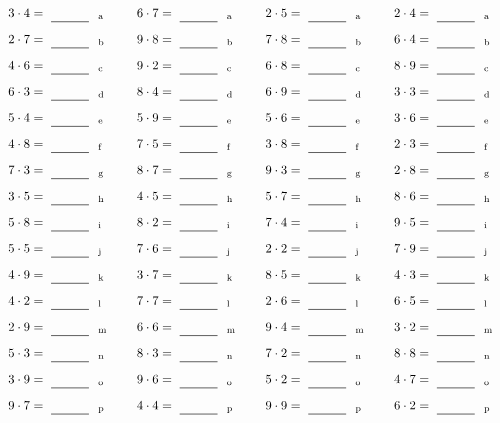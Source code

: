 \documentclass
[
  draft    = true,
  fontsize = 11pt,
  parskip  = half-
]
{scrartcl}
\begin{document}
\par\vfill\par
\begin{align*}
    \pline{3\cdot4}&=\rline{a}
  & \pline{6\cdot7}&=\rline{a}
  & \pline{2\cdot5}&=\rline{a}
  & \pline{2\cdot4}&=\rline{a} \\[1ex]
    \pline{2\cdot7}&=\rline{b}
  & \pline{9\cdot8}&=\rline{b}
  & \pline{7\cdot8}&=\rline{b}
  & \pline{6\cdot4}&=\rline{b} \\[1ex]
    \pline{4\cdot6}&=\rline{c}
  & \pline{9\cdot2}&=\rline{c}
  & \pline{6\cdot8}&=\rline{c}
  & \pline{8\cdot9}&=\rline{c} \\[1ex]
    \pline{6\cdot3}&=\rline{d}
  & \pline{8\cdot4}&=\rline{d}
  & \pline{6\cdot9}&=\rline{d}
  & \pline{3\cdot3}&=\rline{d} \\[1ex]
    \pline{5\cdot4}&=\rline{e}
  & \pline{5\cdot9}&=\rline{e}
  & \pline{5\cdot6}&=\rline{e}
  & \pline{3\cdot6}&=\rline{e} \\[1ex]
    \pline{4\cdot8}&=\rline{f}
  & \pline{7\cdot5}&=\rline{f}
  & \pline{3\cdot8}&=\rline{f}
  & \pline{2\cdot3}&=\rline{f} \\[1ex]
    \pline{7\cdot3}&=\rline{g}
  & \pline{8\cdot7}&=\rline{g}
  & \pline{9\cdot3}&=\rline{g}
  & \pline{2\cdot8}&=\rline{g} \\[1ex]
    \pline{3\cdot5}&=\rline{h}
  & \pline{4\cdot5}&=\rline{h}
  & \pline{5\cdot7}&=\rline{h}
  & \pline{8\cdot6}&=\rline{h} \\[1ex]
    \pline{5\cdot8}&=\rline{i}
  & \pline{8\cdot2}&=\rline{i}
  & \pline{7\cdot4}&=\rline{i}
  & \pline{9\cdot5}&=\rline{i} \\[1ex]
    \pline{5\cdot5}&=\rline{j}
  & \pline{7\cdot6}&=\rline{j}
  & \pline{2\cdot2}&=\rline{j}
  & \pline{7\cdot9}&=\rline{j} \\[1ex]
    \pline{4\cdot9}&=\rline{k}
  & \pline{3\cdot7}&=\rline{k}
  & \pline{8\cdot5}&=\rline{k}
  & \pline{4\cdot3}&=\rline{k} \\[1ex]
    \pline{4\cdot2}&=\rline{l}
  & \pline{7\cdot7}&=\rline{l}
  & \pline{2\cdot6}&=\rline{l}
  & \pline{6\cdot5}&=\rline{l} \\[1ex]
    \pline{2\cdot9}&=\rline{m}
  & \pline{6\cdot6}&=\rline{m}
  & \pline{9\cdot4}&=\rline{m}
  & \pline{3\cdot2}&=\rline{m} \\[1ex]
    \pline{5\cdot3}&=\rline{n}
  & \pline{8\cdot3}&=\rline{n}
  & \pline{7\cdot2}&=\rline{n}
  & \pline{8\cdot8}&=\rline{n} \\[1ex]
    \pline{3\cdot9}&=\rline{o}
  & \pline{9\cdot6}&=\rline{o}
  & \pline{5\cdot2}&=\rline{o}
  & \pline{4\cdot7}&=\rline{o} \\[1ex]
    \pline{9\cdot7}&=\rline{p}
  & \pline{4\cdot4}&=\rline{p}
  & \pline{9\cdot9}&=\rline{p}
  & \pline{6\cdot2}&=\rline{p}
\end{align*}
\end{document}
